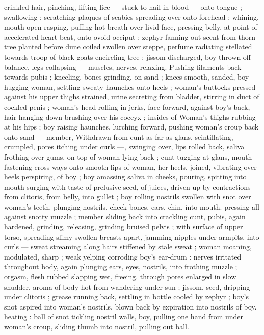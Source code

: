 crinkled hair, pinching, lifting lice --- stuck to nail in blood --- onto
tongue ; swallowing ; scratching plaques of scabies spreading over
onto forehead ; whining, mouth open rasping, puffing hot breath
over livid face, pressing belly, at point of accelerated heart-beat,
onto ovoid occiput ; zephyr fanning out scent from thorn-tree planted
before dune coiled swollen over steppe, perfume radiating stellated
towards troop of black goats encircling tree ; jissom discharged, boy
thrown off balance, legs collapsing --- muscles, nerves, relaxing.
Pushing filaments back towards pubis ; kneeling, bones grinding, on
sand ; knees smooth, sanded, boy hugging woman, settling sweaty
haunches onto heels ; woman's buttocks pressed against his upper
thighs strained, urine secreting from bladder, stirring in duct of
cockled penis ; woman's head rolling in jerks, face forward, against
boy's back, hair hanging down brushing over his coccyx ; insides of
Woman's thighs rubbing at his hips ; boy raising haunches, lurching
forward, pushing woman's croup back onto sand --- member,
Withdrawn from cunt as far as glans, scintillating, crumpled, pores
itching under curls ---, swinging over, lips rolled back, saliva frothing
over gums, on top of woman lying back ; cunt tugging at glans,
mouth fastening cross-ways onto smooth lips of woman, her heels,
joined, vibrating over heels perspiring, of boy ; boy amassing saliva
in cheeks, pouring, spitting into mouth surging with taste of
prelusive seed, of juices, driven up by contractions from clitoris, from
belly, into gullet ; boy rolling nostrils swollen with snot over woman's
teeth, plunging nostrils, cheek-bones, ears, chin, into mouth.
pressing all against snotty muzzle ; member sliding back into
crackling cunt, pubis, again hardened, grinding, releasing, grinding
bruised pelvis ; with surface of upper torso, spreading slimy swollen
breasts apart, jamming nipples under armpits, into curls --- sweat
streaming along hairs stiffened by stale sweat ; woman moaning,
modulated, sharp ; weak yelping corroding boy's ear-drum : nerves
irritated throughout body, again plunging ears, eyes, nostrils, into
frothing muzzle ; orgasm, flesh rubbed slapping wet, freeing.
through pores enlarged in slow shudder, aroma of body hot from
wandering under sun ; jissom, seed, dripping under clitoris ; grease
running back, settling in bottle cooled by zephyr ; boy's snot aspired
into woman's nostrils, blown back by expiration into nostrils of boy.
heating : ball of snot tickling nostril walls, boy, pulling one hand from
under woman's croup, sliding thumb into nostril, pulling out ball.
